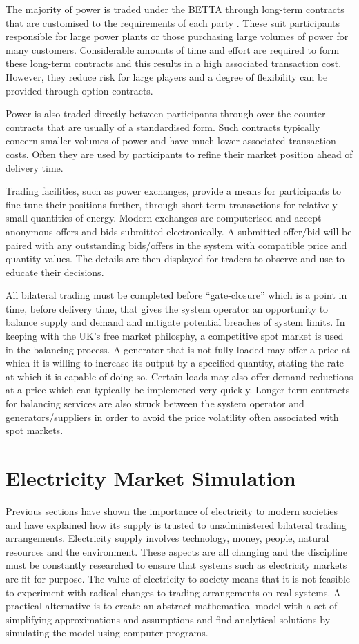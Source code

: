 The majority of power is traded under the BETTA through long-term contracts
that are customised to the requirements of each party \cite{kirschen:book}.
These suit participants responsible for large power plants or those purchasing
large volumes of power for many customers.  Considerable amounts of time and
effort are required to form these long-term contracts and this results in a
high associated transaction cost.  However, they reduce risk for large
players and a degree of flexibility can be provided through option contracts.

Power is also traded directly between participants through over-the-counter
contracts that are usually of a standardised form.  Such contracts
typically concern smaller volumes of power and have much lower associated
transaction costs.  Often they are used by participants to refine their market
position ahead of delivery time.

Trading facilities, such as power exchanges, provide a means for participants
to fine-tune their positions further, through short-term transactions for
relatively small quantities of energy.  Modern exchanges are computerised and
accept anonymous offers and bids submitted electronically.  A submitted
offer/bid will be paired with any outstanding bids/offers in the system with
compatible price and quantity values.  The details are then displayed for
traders to observe and use to educate their decisions.

All bilateral trading must be completed before ``gate-closure'' which is a
point in time, before delivery time, that gives the system operator an
opportunity to balance supply and demand and mitigate potential breaches of
system limits.  In keeping with the UK's free market philosphy, a competitive
spot market \cite{schweppe:spot} is used in the balancing process.  A
generator that is not fully loaded may offer a price at which it is willing to
increase its output by a specified quantity, stating the rate at which it is
capable of doing so.  Certain loads may also offer demand reductions at a
price which can typically be implemeted very quickly.  Longer-term contracts
for balancing services are also struck between the system operator and
generators/suppliers in order to avoid the price volatility often associated
with spot markets.

\section{Electricity Market Simulation}
Previous sections have shown the importance of electricity to
modern societies and have explained how its supply is trusted to unadministered
bilateral trading arrangements.  Electricity supply involves technology, money,
people, natural resources and the environment.  These aspects are all changing
and the discipline must be constantly researched to ensure that systems such as
electricity markets are fit for purpose.  The value of electricity to society
means that it is not feasible to experiment with radical changes to trading
arrangements on real systems.  A practical alternative is to create an abstract mathematical
model with a set of simplifying approximations and assumptions and find
analytical solutions by simulating the model using computer programs.

